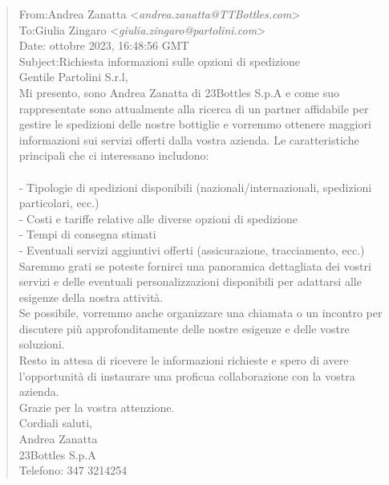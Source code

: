 \footnotesize
\begin{tcolorbox}[colback=gray!20, colframe=gray!50,sharp corners=southwest]
\begin{quote}
From:\qquad Andrea Zanatta <\textit{andrea.zanatta@TTBottles.com}>\\
To:\qquad Giulia Zingaro <\textit{giulia.zingaro@partolini.com}>\\
Date: ottobre 2023, 16:48:56 GMT\\
Subject:\qquad Richiesta informazioni sulle opzioni di spedizione\vspace{14pt}\\
Gentile Partolini S.r.l,\\
Mi presento, sono Andrea Zanatta di 23Bottles S.p.A e come suo rappresentate sono attualmente alla ricerca di un partner affidabile per gestire le spedizioni delle nostre bottiglie e vorremmo ottenere maggiori informazioni sui servizi offerti dalla vostra azienda. Le caratteristiche principali che ci interessano includono:\\
\vspace{14pt}\\
- Tipologie di spedizioni disponibili (nazionali/internazionali, spedizioni particolari, ecc.)\\
- Costi e tariffe relative alle diverse opzioni di spedizione\\
- Tempi di consegna stimati\\
- Eventuali servizi aggiuntivi offerti (assicurazione, tracciamento, ecc.)
\vspace{14pt}\\
Saremmo grati se poteste fornirci una panoramica dettagliata dei vostri servizi e delle eventuali personalizzazioni disponibili per adattarsi alle esigenze della nostra attività.
\vspace{14pt}\\
Se possibile, vorremmo anche organizzare una chiamata o un incontro per discutere più approfonditamente delle nostre esigenze e delle vostre soluzioni.
\vspace{14pt}\\
Resto in attesa di ricevere le informazioni richieste e spero di avere l'opportunità di instaurare una proficua collaborazione con la vostra azienda.
\vspace{14pt}\\
Grazie per la vostra attenzione.
\vspace{14pt}\\
Cordiali saluti,\\
Andrea Zanatta\\
23Bottles S.p.A\\
Telefono: 347 3214254
\end{quote}
\end{tcolorbox}
